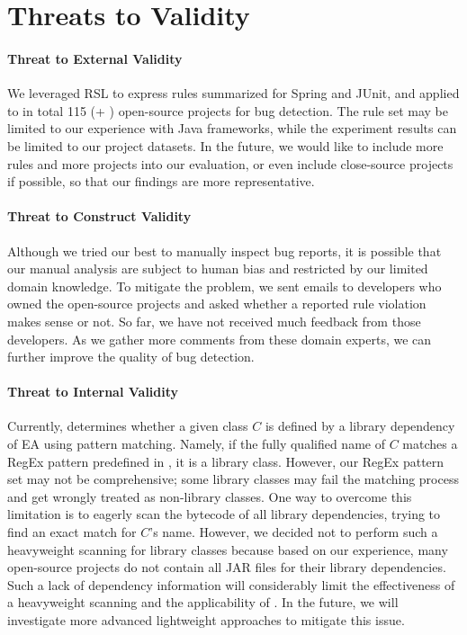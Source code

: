\vspace{-1em}
\section{Threats to Validity}\label{se:threats}


\paragraph{Threat to External Validity}
We leveraged RSL to express \totalRule rules summarized for Spring and JUnit, and applied \tool to in total 115 (\totalInjectedProject + \totalRealProject) open-source projects for bug detection. The rule set may be limited to our experience with Java frameworks, while the experiment results can be limited to our project datasets. In the future, we would like to include more rules and more projects into our evaluation, or even include close-source projects if possible, so that our findings are more representative. 

\vspace{-.5em}
\paragraph{Threat to Construct Validity} Although we tried our best to manually inspect bug reports, it is possible that our manual analysis are subject to human bias and restricted by our limited domain knowledge. To mitigate the problem, we sent emails to developers who owned the open-source projects and asked whether a reported rule violation makes sense or not. So far, we have not received much feedback from those developers. As we gather more comments from these domain experts, we can further improve the quality of bug detection.

\vspace{-.5em}
\paragraph{Threat to Internal Validity} 
Currently, \tool determines whether a given class $C$ is defined by a library dependency of EA using pattern matching. Namely, if the fully qualified name of $C$ matches a RegEx pattern predefined in \tool, it is a library class. However, our RegEx pattern set may not be comprehensive; some library classes may fail the matching process and get wrongly treated as non-library classes. One way to overcome this limitation is to eagerly scan the bytecode of all library dependencies, trying to find an exact match for $C$'s name. However, we decided not to perform such a heavyweight scanning for library classes because based on our experience, many open-source projects do not contain all JAR files for their library dependencies. Such a lack of dependency information will considerably limit the effectiveness of a heavyweight scanning and the applicability of \tool.
In the future, we will investigate more advanced lightweight approaches to mitigate this issue.


